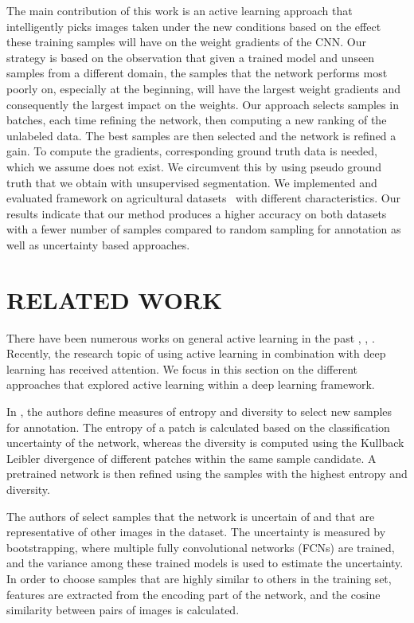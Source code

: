 \documentclass[letterpaper, 10 pt, conference]{ieeeconf}  %
\begin{document}
The main contribution of this work is an active learning approach that
intelligently picks images taken under the new conditions based on the effect
these training samples will have on the weight gradients of the CNN. Our
strategy is based  on the observation that given a trained model and unseen
samples from  a different domain, the samples that the network performs most
poorly on, especially at the  beginning, will have the largest weight
gradients and consequently the largest impact on the  weights.   Our approach
selects samples in batches, each time refining the network, then computing a
new  ranking of the unlabeled data. The best samples are then selected and the
network is refined a gain. To compute the gradients, corresponding ground
truth data is needed, which we assume does  not exist. We circumvent this by
using pseudo ground truth that we obtain with unsupervised  segmentation.  We
implemented and evaluated framework on  agricultural datasets~\cite{chebrolu2017agricultural} 
with different characteristics.  Our results indicate that our method produces a
higher accuracy on both datasets with a fewer  number of samples compared to
random sampling for annotation as well as uncertainty based approaches.


\section{RELATED WORK}
\label{sec:related}

There have been numerous works on general active learning in the past \cite{settles2009active}, \cite{guyon2011results}, \cite{holub2008entropy}. Recently, the research topic of using active learning in combination with deep learning has received attention. We focus in this section on the different approaches that explored active learning within a deep learning framework.

In \cite{zhou2017fine}, the authors define measures of entropy and diversity to select new samples for annotation. The entropy of a patch is calculated based on the classification uncertainty of the network, whereas the diversity is computed using the Kullback Leibler divergence of different patches within the same sample candidate. A pretrained network is then refined using the samples with the highest entropy and diversity.

The authors of \cite{yang2017suggestive} select samples that the network is uncertain of and that are representative of other images in the dataset. The uncertainty is measured by bootstrapping, where multiple fully convolutional networks (FCNs) are trained, and the variance among  these trained models is used to estimate the uncertainty. In order to choose samples that are highly similar to others in the training set, features are extracted from the encoding part of the network, and the cosine similarity between pairs of images is calculated. 
\end{document}
